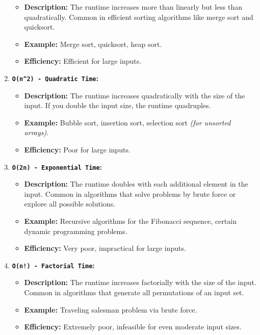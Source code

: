 \documentclass[
  letterpaper,
  DIV=11,
  numbers=noendperiod]{scrreprt}
\providecommand{\tightlist}{%
  \setlength{\itemsep}{0pt}\setlength{\parskip}{0pt}}
\begin{document}
\begin{tcolorbox}[enhanced jigsaw, colframe=quarto-callout-note-color-frame, toprule=.15mm, bottomrule=.15mm, rightrule=.15mm, colback=white, breakable, arc=.35mm, opacityback=0, left=2mm, leftrule=.75mm]
\begin{enumerate}
  \begin{itemize}
  \tightlist
  \item
    \textbf{Description:} The runtime increases more than linearly but
    less than quadratically. Common in efficient sorting algorithms like
    merge sort and quicksort.
  \item
    \textbf{Example:} Merge sort, quicksort, heap sort.
  \item
    \textbf{Efficiency:} Efficient for large inputs.
  \end{itemize}
\item
  \textbf{\texttt{O(n\^{}2)\ -\ Quadratic\ Time}:}

  \begin{itemize}
  \tightlist
  \item
    \textbf{Description:} The runtime increases quadratically with the
    size of the input. If you double the input size, the runtime
    quadruples.
  \item
    \textbf{Example:} Bubble sort, insertion sort, selection sort
    \emph{(for unsorted arrays)}.
  \item
    \textbf{Efficiency:} Poor for large inputs.
  \end{itemize}
\item
  \textbf{\texttt{O(2n)\ -\ Exponential\ Time}:}

  \begin{itemize}
  \tightlist
  \item
    \textbf{Description:} The runtime doubles with each additional
    element in the input. Common in algorithms that solve problems by
    brute force or explore all possible solutions.
  \item
    \textbf{Example:} Recursive algorithms for the Fibonacci sequence,
    certain dynamic programming problems.
  \item
    \textbf{Efficiency:} Very poor, impractical for large inputs.
  \end{itemize}
\item
  \textbf{\texttt{O(n!)\ -\ Factorial\ Time}:}

  \begin{itemize}
  \tightlist
  \item
    \textbf{Description:} The runtime increases factorially with the
    size of the input. Common in algorithms that generate all
    permutations of an input set.
  \item
    \textbf{Example:} Traveling salesman problem via brute force.
  \item
    \textbf{Efficiency:} Extremely poor, infeasible for even moderate
    input sizes.
  \end{itemize}
\end{enumerate}

\end{tcolorbox}
\end{document}
